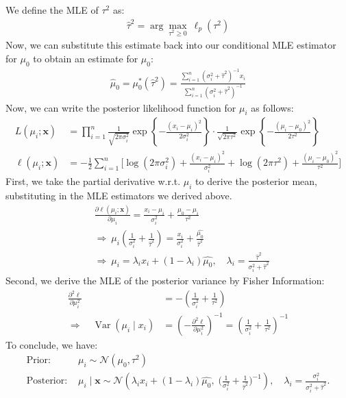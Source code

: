 \documentclass[letterpaper, 11pt]{extarticle}\usepackage[]{graphicx}\usepackage[]{xcolor}
\begin{document}
We define the MLE of $\tau^2$ as:
\begin{align}
    \ \hat{\tau}^2=\arg\max_{\tau^2\ge 0}\ \ell_p(\tau^2)\
\end{align}
Now, we can substitute this estimate back into our conditional MLE estimator for $\mu_0$ to obtain an estimate for $\mu_0$:
\begin{align}
    \ \hat{\mu}_0=\mu_0^*(\hat{\tau}^2)
=\frac{\sum_{i=1}^{n} (\sigma_i^2+\hat{\tau}^2)^{-1} x_i}
{\sum_{i=1}^{n} (\sigma_i^2+\hat{\tau}^2)^{-1}}\
\end{align}
Now, we can write the posterior likelihood function for $\mu_i$ as follows:
\begin{align}
L(\mu_i; \mathbf{x})
&=\prod_{i=1}^{n}
\frac{1}{\sqrt{2\pi\sigma_i^2}}
\exp\!\left\{-\frac{(x_i-\mu_i)^2}{2\sigma_i^2}\right\}
\cdot
\frac{1}{\sqrt{2\pi\tau^2}}
\exp\!\left\{-\frac{(\mu_i-\mu_0)^2}{2\tau^2}\right\}\\
\ell(\mu_i; \mathbf{x})
&= -\frac{1}{2}\sum_{i=1}^{n}\Bigg[
\log(2\pi\sigma_i^2)+\frac{(x_i-\mu_i)^2}{\sigma_i^2}
+\log(2\pi\tau^2)+\frac{(\mu_i-\mu_0)^2}{\tau^2}
\Bigg]
\end{align}
First, we take the partial derivative w.r.t. $\mu_i$ to derive the posterior mean, substituting in the MLE estimators we derived above.
\begin{align}
    &\frac{\partial \ell(\mu_i; \mathbf{x})}{\partial \mu_i}
= \frac{x_i-\mu_i}{\sigma_i^2}+\frac{\mu_0-\mu_i}{\tau^2}\\
&\Rightarrow\ \mu_i\left(\frac{1}{\sigma_i^2}+\frac{1}{\hat{\tau}^2}\right)
=\frac{x_i}{\sigma_i^2}+\frac{\hat{\mu_0}}{\hat{\tau}^2}
\\&\Rightarrow
\ \mu_i
=\lambda_i x_i+(1-\lambda_i)\hat{\mu_0}, \quad 
\lambda_i=\frac{\hat{\tau}^2}{\sigma_i^2+\hat{\tau}^2}
\end{align}
Second, we derive the MLE of the posterior variance by Fisher Information:
\begin{align}
\frac{\partial^2 \ell}{\partial \mu_i^2} 
&= -\left( \frac{1}{\sigma_i^2} + \frac{1}{\tau^2} \right) \\[8pt]
\Rightarrow\quad 
\operatorname{Var}(\mu_i \mid x_i) 
&= \left( -\frac{\partial^2 \ell}{\partial \mu_i^2} \right)^{-1} 
= \left( \frac{1}{\sigma_i^2} + \frac{1}{\tau^2} \right)^{-1}
\end{align}
To conclude, we have:
\begin{align}
    \textrm{Prior: }&\mu_i \sim \mathcal{N}(\mu_0, \tau^2)\\
    \textrm{Posterior: }& \mu_i \mid \mathbf{x} \sim \mathcal{N}\left(
\lambda_i x_i+(1-\lambda_i)\hat{\mu_0},\;
\Big(\frac{1}{\sigma_i^2}+\frac{1}{\hat{\tau}^2}\Big)^{-1}
\right), \quad \lambda_i=\frac{\sigma_i^2}{\sigma_i^2+\hat{\tau}^2}.
\end{align}
\newpage


\end{document}
